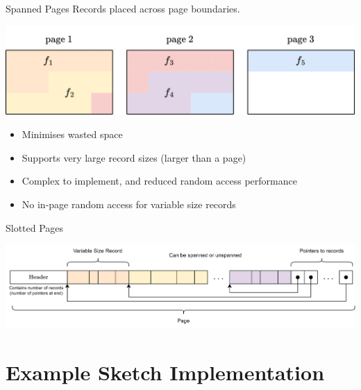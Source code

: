 \begin{definitionbox}{Spanned Pages}
    Records placed across page boundaries.
    \begin{center}
        \includegraphics[width=.8\textwidth]{storage/images/spanned_page.drawio.png}
    \end{center}
    \begin{itemize}
        \item Minimises wasted space
        \item Supports very large record sizes (larger than a page)
        \item Complex to implement, and reduced random access performance
        \item No in-page random access for variable size records
    \end{itemize}
\end{definitionbox}

\begin{definitionbox}{Slotted Pages}
    \begin{center}
        \includegraphics[width=.8\textwidth]{storage/images/slotted_pages.drawio.png}
    \end{center}
\end{definitionbox}



\section{Example Sketch Implementation}


